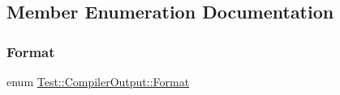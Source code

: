 \subsection{Member Enumeration Documentation}
\mbox{\label{class_test_1_1_compiler_output_ab34cf506804cefbc67545a256af196ff}} 
\subsubsection{\texorpdfstring{Format}{Format}}
{\footnotesize\ttfamily enum \mbox{\hyperlink{class_test_1_1_compiler_output_ab34cf506804cefbc67545a256af196ff}{Test\+::\+Compiler\+Output\+::\+Format}}}

